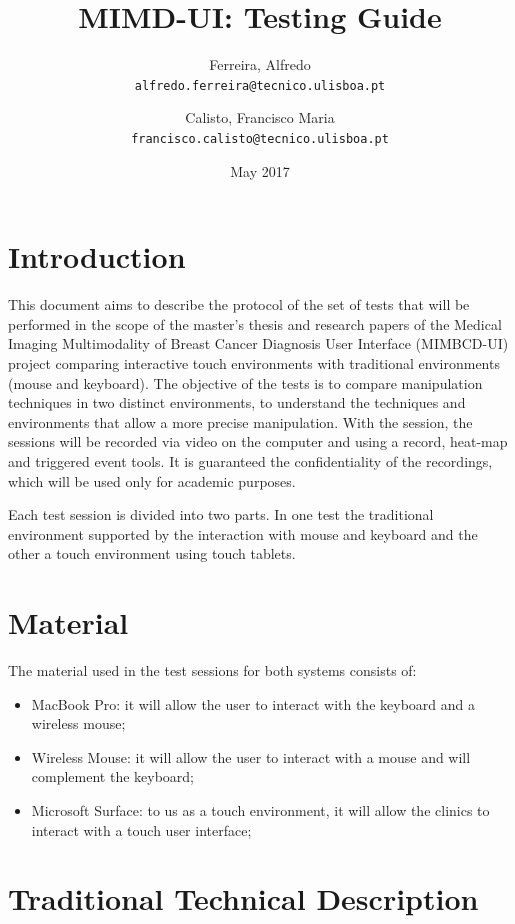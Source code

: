 \documentclass{article}
\title{MIMD-UI: Testing Guide}
\author{
  Ferreira, Alfredo\\
  \texttt{alfredo.ferreira@tecnico.ulisboa.pt}
  \and
  Calisto, Francisco Maria\\
  \texttt{francisco.calisto@tecnico.ulisboa.pt}
}
\date{May 2017}
\begin{document}
\maketitle

\section{Introduction}

This document aims to describe the protocol of the set of tests that will be performed in the scope of the master's thesis and research papers of the Medical Imaging Multimodality of Breast Cancer Diagnosis User Interface (MIMBCD-UI) project comparing interactive touch environments with traditional environments (mouse and keyboard). The objective of the tests is to compare manipulation techniques in two distinct environments, to understand the techniques and environments that allow a more precise manipulation. With the session, the sessions will be recorded via video on the computer and using a record, heat-map and triggered event tools. It is guaranteed the confidentiality of the recordings, which will be used only for academic purposes.

Each test session is divided into two parts. In one test the traditional environment supported by the interaction with mouse and keyboard and the other a touch environment using touch tablets.

\section{Material}

The material used in the test sessions for both systems consists of:

\begin{itemize}
  \item MacBook Pro: it will allow the user to interact with the keyboard and a wireless mouse;
  \item Wireless Mouse: it will allow the user to interact with a mouse and will complement the keyboard;
  \item Microsoft Surface: to us as a touch environment, it will allow the clinics to interact with a touch user interface;
\end{itemize}

\section{Traditional Technical Description}
\end{document}
